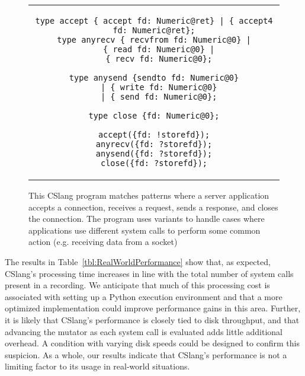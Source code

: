 \begin{figure}[H]
\centering
\begin{tabular}{c}
\begin{lstlisting}
type accept { accept fd: Numeric@ret} | { accept4 fd: Numeric@ret};
type anyrecv { recvfrom fd: Numeric@0} |
  { read fd: Numeric@0} |
  { recv fd: Numeric@0};

type anysend {sendto fd: Numeric@0}
  | { write fd: Numeric@0}
  | { send fd: Numeric@0};

type close {fd: Numeric@0};

accept({fd: !storefd});
anyrecv({fd: ?storefd});
anysend({fd: ?storefd});
close({fd: ?storefd});
\end{lstlisting}
\end{tabular}
\caption{This CSlang program matches patterns where a server application
  accepts a connection, receives a request, sends a response, and closes
  the connection.  The program uses variants to handle cases where
  applications use different system calls to perform some common action
  (e.g. receiving data from a socket)}
\label{lst:RealWorldPerformance}
\end{figure}

The results in Table~\ref{tbl:RealWorldPerformance} show that, as expected,
CSlang's
processing time increases in line with the total number of system calls
present in a recording.  We anticipate that much of this processing cost is
associated with setting up a Python execution environment and that a more
optimized implementation could improve performance gains in this area.
Further,
it is likely that CSlang's performance is closely tied to
disk throughput,
and that advancing the mutator
as each system call is evaluated
adds little additional overhead.
A condition with varying disk
speeds could be designed to confirm this suspicion.  As a whole, our
results indicate that CSlang's performance is not a limiting factor to its
usage in real-world situations.
